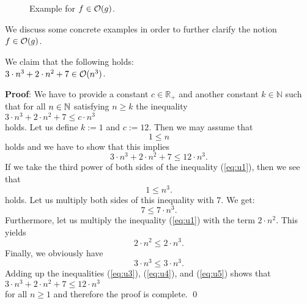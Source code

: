 \begin{figure}[!ht]
  \centering
  \caption{Example for $f \in \mathcal{O}(g)$.} 
  \label{fig:big-o.eps}
\end{figure}


\noindent
We discuss some concrete examples in order to further clarify the notion $f \in \mathcal{O}(g)$.

\example
We claim that the following holds:
\\[0.2cm]
\hspace*{1.3cm}
$3 \cdot n^3 + 2 \cdot n^2 + 7 \in \mathcal{O}(n^3)$. 
\ex

\noindent
\textbf{Proof}:  We have to  provide a constant $c\in\mathbb{R}_+$ and another constant $k\in\mathbb{N}$ such that for all $n\in
{\mathbb N}$ satisfying
$n \geq k$ the inequality
\\[0.2cm]
\hspace*{1.3cm} 
$3 \cdot n^3 + 2 \cdot n^2 + 7 \leq c \cdot n^3$
\\[0.2cm]
holds.  Let us define  $k := 1$ and $c := 12$.  Then we may assume that 
\begin{equation}
  \label{eq:u1}
  1\leq n  
\end{equation}
holds and we have to show that this implies 
\begin{equation}
  \label{eq:u2}
  3 \cdot n^3 + 2 \cdot n^2 + 7 \leq 12 \cdot n^3.
\end{equation}
If we take the third power of both sides of the inequality (\ref{eq:u1}), then we see that
\begin{equation}
  \label{eq:u3pre}
  1 \leq n^3.
\end{equation}
holds.  Let us multiply both sides of this inequality with $7$.  We get: 
\begin{equation}
  \label{eq:u3}
  7 \leq 7 \cdot n^3.
\end{equation}
Furthermore, let us multiply the inequality (\ref{eq:u1}) with the term $2\cdot n^2$.  This yields
\begin{equation}
  \label{eq:u4}
  2 \cdot n^2 \leq 2 \cdot n^3.
\end{equation}
Finally, we obviously have
\begin{equation}
  \label{eq:u5}
  3 \cdot n^3 \leq 3 \cdot n^3.
\end{equation}
Adding up the inequalities (\ref{eq:u3}), (\ref{eq:u4}), and (\ref{eq:u5}) shows that \\[0.2cm]
\hspace*{1.3cm} $3 \cdot n^3 + 2 \cdot n^2 + 7 \leq 12 \cdot n^3$ \\[0.2cm]
for all $n \geq 1$ and therefore the proof is complete. \qed

